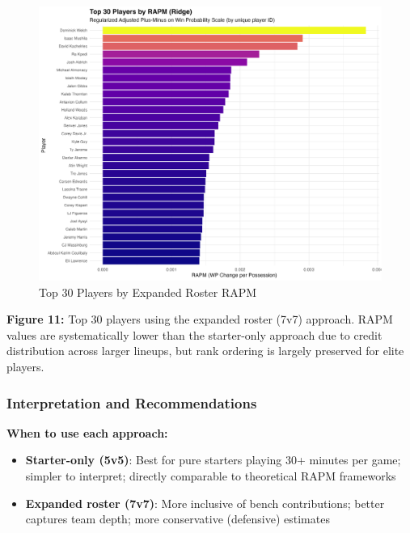 \documentclass[
  letterpaper,
  DIV=11,
  numbers=noendperiod]{scrartcl}
\providecommand{\tightlist}{%
  \setlength{\itemsep}{0pt}\setlength{\parskip}{0pt}}
\begin{document}
\begin{figure}[H]

{\centering \includegraphics[width=1\linewidth,height=\textheight,keepaspectratio]{new_figs/top_players_rapm.png}

}

\caption{Top 30 Players by Expanded Roster RAPM}

\end{figure}%

\textbf{Figure 11:} Top 30 players using the expanded roster (7v7)
approach. RAPM values are systematically lower than the starter-only
approach due to credit distribution across larger lineups, but rank
ordering is largely preserved for elite players.

\subsubsection{Interpretation and
Recommendations}\label{interpretation-and-recommendations}

\textbf{When to use each approach:}

\begin{itemize}
\tightlist
\item
  \textbf{Starter-only (5v5)}: Best for pure starters playing 30+
  minutes per game; simpler to interpret; directly comparable to
  theoretical RAPM frameworks
\item
  \textbf{Expanded roster (7v7)}: More inclusive of bench contributions;
  better captures team depth; more conservative (defensive) estimates
\end{itemize}
\end{document}
